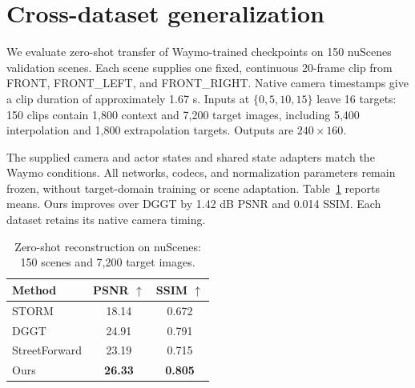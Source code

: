 \section{Cross-dataset generalization}
\label{sec:supp-generalization}
We evaluate zero-shot transfer of Waymo-trained checkpoints on 150 nuScenes validation scenes. Each scene supplies one fixed, continuous 20-frame clip from FRONT, FRONT\_LEFT, and FRONT\_RIGHT. Native camera timestamps give a clip duration of approximately 1.67 s. Inputs at $\{0,5,10,15\}$ leave 16 targets: 150 clips contain 1,800 context and 7,200 target images, including 5,400 interpolation and 1,800 extrapolation targets. Outputs are $240\times160$.

The supplied camera and actor states and shared state adapters match the Waymo conditions. All networks, codecs, and normalization parameters remain frozen, without target-domain training or scene adaptation. Table~\ref{tab:generalization} reports means. Ours improves over DGGT by 1.42 dB PSNR and 0.014 SSIM. Each dataset retains its native camera timing.

\begin{table}[H]
\centering\small
\setlength{\tabcolsep}{4pt}
\caption{Zero-shot reconstruction on nuScenes: 150 scenes and 7,200 target images.}
\label{tab:generalization}
\begin{tabular}{@{}lcc@{}}
\toprule
Method & PSNR $\uparrow$ & SSIM $\uparrow$ \\
\midrule
STORM & 18.14 & 0.672 \\
DGGT & 24.91 & 0.791 \\
StreetForward & 23.19 & 0.715 \\
Ours & \textbf{26.33} & \textbf{0.805} \\
\bottomrule
\end{tabular}
\end{table}
